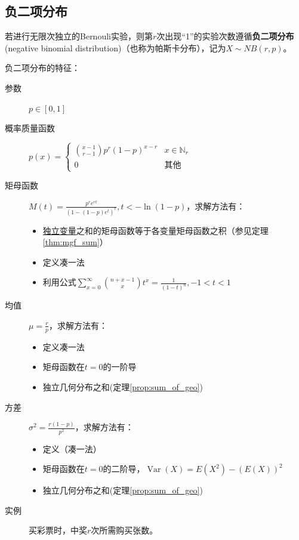 \subsection{负二项分布}

\begin{definition}
    若进行无限次独立的Bernouli实验，则第$r$次出现“1”的实验次数遵循\textbf{负二项分布}(negative binomial distribution)（也称为帕斯卡分布），记为$X \sim NB(r,p)$。
\end{definition}

负二项分布的特征：
\begin{description}
    \item[参数] $p \in [0,1]$
    \item[概率质量函数] $p(x)=\begin{cases}
                \binom{x-1}{r-1}p^r (1-p)^{x-r} & x \in \mathbb{N}_r \\
                0                                 & \text{其他}
            \end{cases}$
    \item[矩母函数] $M(t)=\frac{p^r e^{rt}}{(1-(1-p)e^t)^r}, t<-\ln (1-p)$，求解方法有：
        \begin{itemize}
            \item \underline{独立变量}之和的矩母函数等于各变量矩母函数之积（参见定理\ref{thm:mgf_sum}）
            \item 定义凑一法
            \item 利用公式$\sum_{x=0}^{\infty}\binom{n+x-1}{x}t^x=\frac{1}{(1-t)^n},-1<t<1$
        \end{itemize}
    \item[均值] $\mu=\frac{r}{p}$，求解方法有：
        \begin{itemize}
            \item 定义凑一法
            \item 矩母函数在$t=0$的一阶导
            \item 独立几何分布之和(定理\ref{prop:sum_of_geo})
        \end{itemize}
    \item[方差] $\sigma^2=\frac{r(1-p)}{p^2}$，求解方法有：
        \begin{itemize}
            \item 定义（凑一法）
            \item 矩母函数在$t=0$的二阶导，$\operatorname{Var}(X)=E(X^2)-(E(X))^2$
            \item 独立几何分布之和(定理\ref{prop:sum_of_geo})
        \end{itemize}
    \item[实例] 买彩票时，中奖$r$次所需购买张数。
\end{description}


